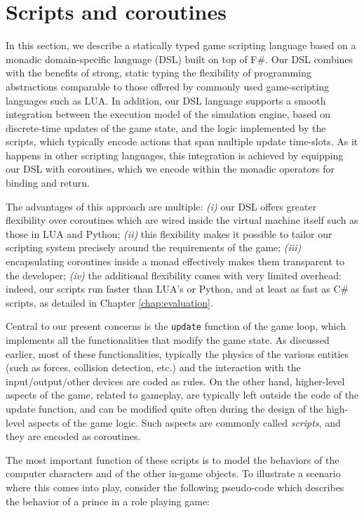 \section{Scripts and coroutines}
In this section, we describe a statically typed game scripting language based on a monadic domain-specific language (DSL) built on top of F\#. Our DSL combines with the benefits of strong, static typing the flexibility of programming abstractions comparable to those offered by commonly used game-scripting languages such as LUA. In addition, our DSL language supports a  smooth integration between the execution model of the simulation engine, based on discrete-time updates of the game state, and the logic implemented by the scripts, which typically encode actions that span multiple update time-slots. As it happens in other scripting languages, this integration is achieved by equipping our DSL with coroutines, which we encode within the monadic operators for binding and return.

The advantages of this approach are multiple: \textit{(i)} our DSL offers greater flexibility over coroutines which are wired inside the virtual machine itself such as those in LUA and Python; \textit{(ii)} this flexibility makes it possible to tailor our scripting system precisely around the requirements of the game; \textit{(iii)} encapsulating coroutines inside a monad effectively makes them transparent to the developer; \textit{(iv)} the additional flexibility comes with very limited overhead: indeed, our scripts run faster than LUA's or Python, and at least as fast as C\# scripts, as detailed in Chapter \ref{chap:evaluation}.

Central to our present concerns is the \texttt{update} function of the game loop, which implements all the functionalities that modify the game state. As discussed earlier, most of these functionalities, typically the physics of the various entities (such as forces, collision detection, etc.) and the interaction with the input/output/other devices are coded as rules. On the other hand, higher-level aspects of the game, related to gameplay, are typically left outside the code of the update function, and can be modified quite often during the design of the high-level aspects of the game logic. Such aspects are commonly called \textit{scripts}, and they are encoded as coroutines.

The most important function of these scripts is to model the behaviors of the computer characters and of the other in-game objects. To illustrate a scenario where this comes into play, consider the following pseudo-code which describes the behavior of a prince in a role playing game:

